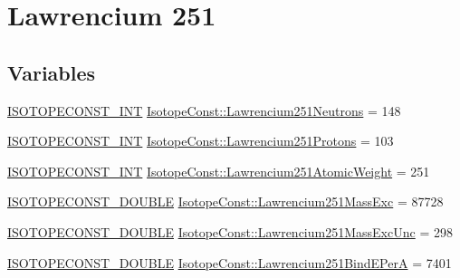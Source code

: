 \hypertarget{group___isotope_const-_lawrencium-_lr251}{}\section{Lawrencium 251}
\label{group___isotope_const-_lawrencium-_lr251}
\subsection*{Variables}
\begin{DoxyCompactItemize}
\item 
\mbox{\hyperlink{group___isotope_const-_macros_ga5f18360b3e99483a35c32d789e62621c}{I\+S\+O\+T\+O\+P\+E\+C\+O\+N\+S\+T\+\_\+\+I\+NT}} \mbox{\hyperlink{group___isotope_const-_lawrencium-_lr251_ga2a3aeb12b63ca9152b5fc6468ea9e70d}{Isotope\+Const\+::\+Lawrencium251\+Neutrons}} = 148
\item 
\mbox{\hyperlink{group___isotope_const-_macros_ga5f18360b3e99483a35c32d789e62621c}{I\+S\+O\+T\+O\+P\+E\+C\+O\+N\+S\+T\+\_\+\+I\+NT}} \mbox{\hyperlink{group___isotope_const-_lawrencium-_lr251_gaadc9ac4d9d020d0b805f35d9c0a819aa}{Isotope\+Const\+::\+Lawrencium251\+Protons}} = 103
\item 
\mbox{\hyperlink{group___isotope_const-_macros_ga5f18360b3e99483a35c32d789e62621c}{I\+S\+O\+T\+O\+P\+E\+C\+O\+N\+S\+T\+\_\+\+I\+NT}} \mbox{\hyperlink{group___isotope_const-_lawrencium-_lr251_ga10df17f0619ec390e6de6dc8756c6738}{Isotope\+Const\+::\+Lawrencium251\+Atomic\+Weight}} = 251
\item 
\mbox{\hyperlink{group___isotope_const-_macros_ga8f45a7272ce02c0b4c65c44636ed719a}{I\+S\+O\+T\+O\+P\+E\+C\+O\+N\+S\+T\+\_\+\+D\+O\+U\+B\+LE}} \mbox{\hyperlink{group___isotope_const-_lawrencium-_lr251_gadcb1f45a59e5a88f61ae731162090758}{Isotope\+Const\+::\+Lawrencium251\+Mass\+Exc}} = 87728
\item 
\mbox{\hyperlink{group___isotope_const-_macros_ga8f45a7272ce02c0b4c65c44636ed719a}{I\+S\+O\+T\+O\+P\+E\+C\+O\+N\+S\+T\+\_\+\+D\+O\+U\+B\+LE}} \mbox{\hyperlink{group___isotope_const-_lawrencium-_lr251_gadaac1d043dab15826d8ab28e43973da2}{Isotope\+Const\+::\+Lawrencium251\+Mass\+Exc\+Unc}} = 298
\item 
\mbox{\hyperlink{group___isotope_const-_macros_ga8f45a7272ce02c0b4c65c44636ed719a}{I\+S\+O\+T\+O\+P\+E\+C\+O\+N\+S\+T\+\_\+\+D\+O\+U\+B\+LE}} \mbox{\hyperlink{group___isotope_const-_lawrencium-_lr251_ga0223a61b0d369b67f26886c3bab27a6b}{Isotope\+Const\+::\+Lawrencium251\+Bind\+E\+PerA}} = 7401
\item 

\end{DoxyCompactItemize}
